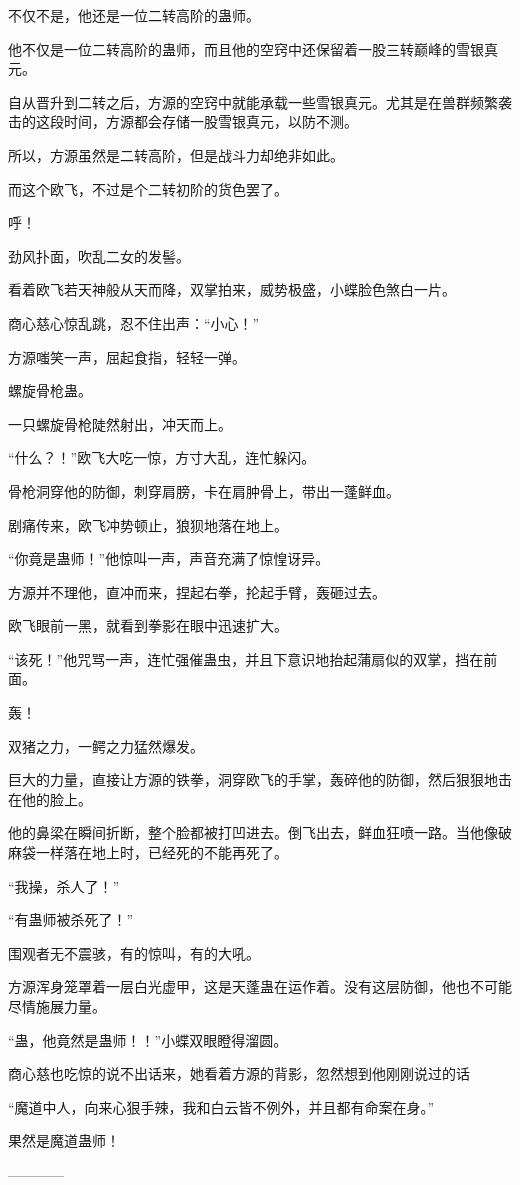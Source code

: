\begin{this_body}
不仅不是，他还是一位二转高阶的蛊师。

他不仅是一位二转高阶的蛊师，而且他的空窍中还保留着一股三转巅峰的雪银真元。

自从晋升到二转之后，方源的空窍中就能承载一些雪银真元。尤其是在兽群频繁袭击的这段时间，方源都会存储一股雪银真元，以防不测。

所以，方源虽然是二转高阶，但是战斗力却绝非如此。

而这个欧飞，不过是个二转初阶的货色罢了。

呼！

劲风扑面，吹乱二女的发髻。

看着欧飞若天神般从天而降，双掌拍来，威势极盛，小蝶脸色煞白一片。

商心慈心惊乱跳，忍不住出声：“小心！”

方源嗤笑一声，屈起食指，轻轻一弹。

螺旋骨枪蛊。

一只螺旋骨枪陡然射出，冲天而上。

“什么？！”欧飞大吃一惊，方寸大乱，连忙躲闪。

骨枪洞穿他的防御，刺穿肩膀，卡在肩肿骨上，带出一蓬鲜血。

剧痛传来，欧飞冲势顿止，狼狈地落在地上。

“你竟是蛊师！”他惊叫一声，声音充满了惊惶讶异。

方源并不理他，直冲而来，捏起右拳，抡起手臂，轰砸过去。

欧飞眼前一黑，就看到拳影在眼中迅速扩大。

“该死！”他咒骂一声，连忙强催蛊虫，并且下意识地抬起蒲扇似的双掌，挡在前面。

轰！

双猪之力，一鳄之力猛然爆发。

巨大的力量，直接让方源的铁拳，洞穿欧飞的手掌，轰碎他的防御，然后狠狠地击在他的脸上。

他的鼻梁在瞬间折断，整个脸都被打凹进去。倒飞出去，鲜血狂喷一路。当他像破麻袋一样落在地上时，已经死的不能再死了。

“我操，杀人了！”

“有蛊师被杀死了！”

围观者无不震骇，有的惊叫，有的大吼。

方源浑身笼罩着一层白光虚甲，这是天蓬蛊在运作着。没有这层防御，他也不可能尽情施展力量。

“蛊，他竟然是蛊师！！”小蝶双眼瞪得溜圆。

商心慈也吃惊的说不出话来，她看着方源的背影，忽然想到他刚刚说过的话

“魔道中人，向来心狠手辣，我和白云皆不例外，并且都有命案在身。”

果然是魔道蛊师！

------------

\end{this_body}

